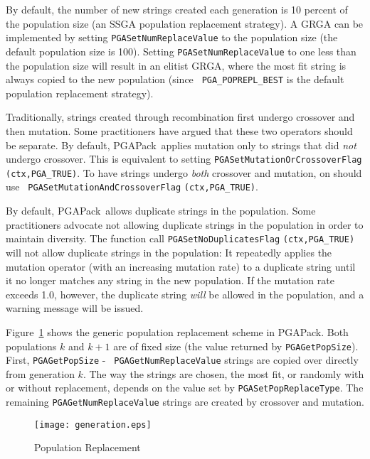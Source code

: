 \documentclass{report}
\newcommand{\pga}{PGAPack}
\begin{document}
By default, the number of new strings created each generation is 10 percent
of the population size (an SSGA population replacement strategy).  A GRGA can
be implemented by setting {\tt PGASetNumReplaceValue} to the population size
(the default population size is 100).  Setting {\tt PGASetNumReplaceValue} to
one less than the population size will result in an elitist GRGA, where the
most fit string is always copied to the new population (since {\tt
PGA\_POPREPL\_BEST} is the default population replacement strategy).

\begin{sloppypar}
Traditionally, strings created through recombination first undergo crossover
and then mutation.  Some practitioners \cite{Da91} have argued that these two
operators should be separate.  By default, \pga\ applies mutation only to
strings that did {\em not} undergo crossover.  This is equivalent to setting
{\tt PGASetMutationOrCrossoverFlag} {\tt (ctx,PGA\_TRUE)}.  To have strings
undergo {\em both} crossover and mutation, on should use {\tt
PGASetMutationAndCrossoverFlag} {\tt (ctx,PGA\_TRUE)}.
\end{sloppypar}

By default, \pga\ allows duplicate strings in the population.  Some
practitioners advocate not allowing duplicate strings in the population in
order to maintain diversity.  The function call {\tt PGASetNoDuplicatesFlag}
{\tt (ctx,PGA\_TRUE)} will not allow duplicate strings in the population: It
repeatedly applies the mutation operator (with an increasing mutation rate) to
a duplicate string until it no longer matches any string in the new
population.  If the mutation rate exceeds 1.0, however, the duplicate string
{\em will} be allowed in the population, and a warning message will be issued.

Figure~\ref{fig:popreplace} shows the generic population replacement scheme in
\pga.  Both populations $k$ and $k+1$  are of fixed size (the value returned by
{\tt PGAGetPopSize}).  First, {\tt PGAGetPopSize} - {\tt
PGAGetNumReplaceValue} strings are copied over directly from generation $k$.
The way the strings are chosen, the most fit, or randomly with or without
replacement, depends on the value set by {\tt PGASetPopReplaceType}.  The
remaining {\tt PGAGetNumReplaceValue} strings are created by crossover and
mutation.

\begin{figure}
\centerline{\texttt{[image: generation.eps]}}
\caption{Population Replacement}\label{fig:popreplace}
\end{figure}
\end{document}

